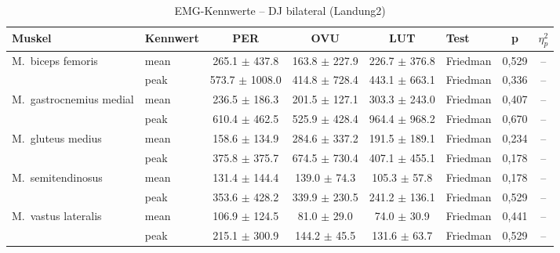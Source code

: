 \begin{table}[H]
  \centering
  \caption{EMG-Kennwerte – DJ bilateral (Landung2)}
  \label{tab:DJ_bilateral_Landung2}
  \small
  \begin{tabular}{l l c c c l c c}
    \hline
    \textbf{Muskel} & \textbf{Kennwert} & \textbf{PER} & \textbf{OVU} & \textbf{LUT} & \textbf{Test} & \textbf{p} & \textbf{$\eta^2_p$} \\
    \hline
    M.~biceps femoris & mean & 265.1 $\pm$ 437.8 & 163.8 $\pm$ 227.9 & 226.7 $\pm$ 376.8 & Friedman & 0{,}529 & -- \\
     & peak & 573.7 $\pm$ 1008.0 & 414.8 $\pm$ 728.4 & 443.1 $\pm$ 663.1 & Friedman & 0{,}336 & -- \\
    \hline
    M.~gastrocnemius medial & mean & 236.5 $\pm$ 186.3 & 201.5 $\pm$ 127.1 & 303.3 $\pm$ 243.0 & Friedman & 0{,}407 & -- \\
     & peak & 610.4 $\pm$ 462.5 & 525.9 $\pm$ 428.4 & 964.4 $\pm$ 968.2 & Friedman & 0{,}670 & -- \\
    \hline
    M.~gluteus medius & mean & 158.6 $\pm$ 134.9 & 284.6 $\pm$ 337.2 & 191.5 $\pm$ 189.1 & Friedman & 0{,}234 & -- \\
     & peak & 375.8 $\pm$ 375.7 & 674.5 $\pm$ 730.4 & 407.1 $\pm$ 455.1 & Friedman & 0{,}178 & -- \\
    \hline
    M.~semitendinosus & mean & 131.4 $\pm$ 144.4 & 139.0 $\pm$ 74.3 & 105.3 $\pm$ 57.8 & Friedman & 0{,}178 & -- \\
     & peak & 353.6 $\pm$ 428.2 & 339.9 $\pm$ 230.5 & 241.2 $\pm$ 136.1 & Friedman & 0{,}529 & -- \\
    \hline
    M.~vastus lateralis & mean & 106.9 $\pm$ 124.5 & 81.0 $\pm$ 29.0 & 74.0 $\pm$ 30.9 & Friedman & 0{,}441 & -- \\
     & peak & 215.1 $\pm$ 300.9 & 144.2 $\pm$ 45.5 & 131.6 $\pm$ 63.7 & Friedman & 0{,}529 & -- \\
    \hline
  \end{tabular}
\end{table}

